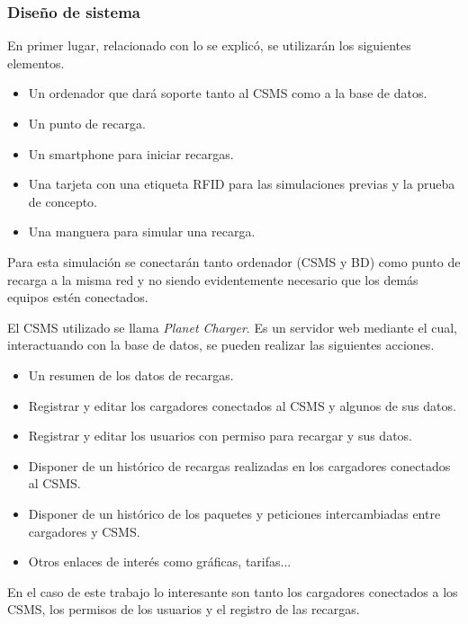 \documentclass[12pt,a4paper,onecolumn,oneside]{report}
\begin{document}
\subsubsection{Diseño de sistema}

En primer lugar, relacionado con lo se explicó, se utilizarán los siguientes elementos.

\begin{itemize}
\item Un ordenador que dará soporte tanto al CSMS como a la base de datos.
\item Un punto de recarga.
\item Un smartphone para iniciar recargas.
\item Una tarjeta con una etiqueta RFID para las simulaciones previas y la prueba de concepto.
\item Una manguera para simular una recarga.
\end{itemize}

Para esta simulación se conectarán tanto ordenador (CSMS y BD) como punto de recarga a la misma red y no siendo evidentemente necesario que los demás equipos estén conectados.

El CSMS utilizado se llama \textit{Planet Charger}. Es un servidor web mediante el cual, interactuando con la base de datos, se pueden realizar las siguientes acciones.

\begin{itemize} 
\item Un resumen de los datos de recargas.
\item Registrar y editar los cargadores conectados al CSMS y algunos de sus datos.
\item Registrar y editar los usuarios con permiso para recargar y sus datos.
\item Disponer de un histórico de recargas realizadas en los cargadores conectados al CSMS.
\item Disponer de un histórico de los paquetes y peticiones intercambiadas entre cargadores y CSMS.
\item Otros enlaces de interés como gráficas, tarifas...
\end{itemize}


En el caso de este trabajo lo interesante son tanto los cargadores conectados a los CSMS, los permisos de los usuarios y el registro de las recargas.
\end{document}
